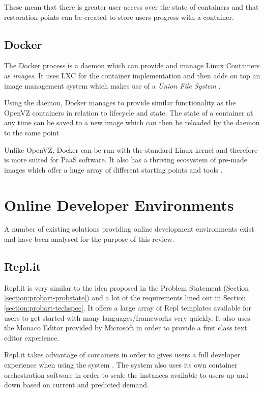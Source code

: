 These mean that there is greater user access over the state of containers and that restoration points can be created to store users progress with a container.

\subsection{Docker}

The Docker process is a daemon which can provide and manage Linux Containers as \textit{images}. It uses LXC for the container implementation and then adds on top an image management system which makes use of a \textit{Union File System} \cite{contsvsvirt}.

Using the daemon, Docker manages to provide similar functionality as the OpenVZ containers in relation to lifecycle and state. The state of a container at any time can be saved to a new image which can then be reloaded by the daemon to the same point

Unlike OpenVZ, Docker can be run with the standard Linux kernel and therefore is more suited for PaaS software. It also has a thriving ecosystem of pre-made images which offer a huge array of different starting points and tools \cite{dockerhub}.

\section{Online Developer Environments} \label{lit-ode}

A number of existing solutions providing online development environments exist and have been analysed for the purpose of this review.

\subsection{Repl.it}

Repl.it is very similar to the idea proposed in the Problem Statement (Section \ref{section:probart-probstate}) and a lot of the requirements lined out in Section \ref{section:probart-techspec}. It offers a large array of Repl templates available for users to get started with many languages/frameworks very quickly. It also uses the Monaco Editor provided by Microsoft in order to provide a first class text editor experience.

Repl.it takes advantage of containers in order to gives users a full developer experience when using the system \cite{replit-containers}. The system also uses its own container orchestration software in order to scale the instances available to users up and down based on current and predicted demand.

